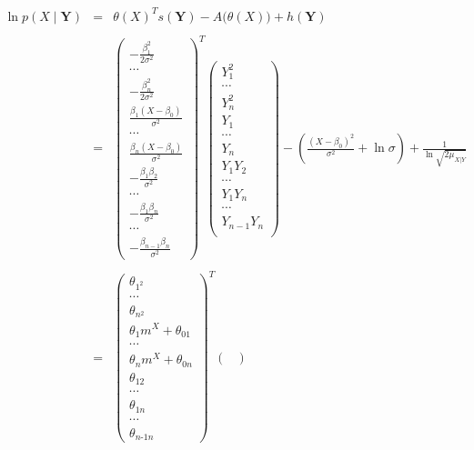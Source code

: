 \documentclass[11pt, oneside]{article}   	%
\numberwithin{figure}{section}
\numberwithin{equation}{section}
\numberwithin{table}{section}
\theoremstyle{definition}
\begin{document}
\begin{appendices}
\begin{itemize}
\begin{eqnarray*}
\ln p(X\mid \mathbf{Y}) &=& \theta(X)^T s(\mathbf{Y}) - A \big(\theta(X) \big) + h(\mathbf{Y})\\\\
&=&
\begin{pmatrix}
-\frac{\beta_1^2}{2\sigma^2}\\
\cdots\\
-\frac{\beta_n^2}{2\sigma^2}\\
\frac{\beta_1(X-\beta_0)}{\sigma^2}\\
\cdots\\
\frac{\beta_n(X-\beta_0)}{\sigma^2}\\
-\frac{\beta_1\beta_2}{\sigma^2}\\
\cdots\\
-\frac{\beta_1\beta_n}{\sigma^2}\\
\cdots\\
-\frac{\beta_{n-1}\beta_n}{\sigma^2}
\end{pmatrix}^T
\begin{pmatrix}
Y_1^2\\
\cdots\\
Y_n^2\\
Y_1\\
\cdots\\
Y_n\\
Y_1 Y_2\\
\cdots\\
Y_1 Y_n\\
\cdots\\
Y_{n-1}Y_{n}\\
\end{pmatrix}
- \left( \frac{(X-\beta_0)^2}{\sigma^2} + \ln{\sigma} \right) + \frac{1}{\ln{\sqrt{2\mu_{X|Y}}}}\\\\
&=&
\begin{pmatrix}
\theta_{1^2}\\
\cdots\\
\theta_{n^2}\\
\theta_1 m^X+\theta_{01}\\
\cdots\\
\theta_n m^X+\theta_{0n}\\
\theta_{12}\\
\cdots\\
\theta_{1n}\\
\cdots\\
\theta_{n\mbox{-}1n}
\end{pmatrix}^T
\begin{pmatrix}

\end{pmatrix}
\end{eqnarray*}
\end{itemize}
\end{appendices}
\end{document}
